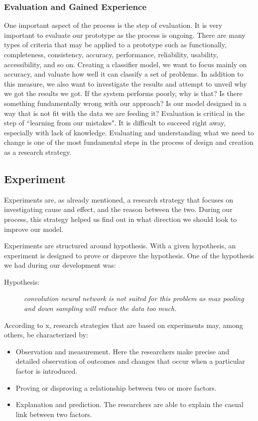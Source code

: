 \subsubsection{Evaluation and Gained Experience}
One important aspect of the process is the step of evaluation. It is very important to evaluate our prototype as the process is ongoing. There are many types of criteria that may be applied to a prototype such as functionally, completeness, consistency, accuracy, performance, reliability, usability, accessibility, and so on. Creating a classifier model, we want to focus mainly on accuracy, and valuate how well it can classify a set of problems. In addition to this measure, we also want to investigate the results and attempt to unveil why we got the results we got. If the system performs poorly, why is that? Is there something fundamentally wrong with our approach? Is our model designed in a way that is not fit with the data we are feeding it? Evaluation is critical in the step of ``learning from our mistakes". It is difficult to succeed right away, especially with lack of knowledge. Evaluating and understanding what we need to change is one of the most fundamental steps in the process of design and creation as a research strategy.

\subsection{Experiment}
Experiments are, as already mentioned, a research strategy that focuses on investigating cause and effect, and the reason between the two. During our process, this strategy helped us find out in what direction we should look to improve our model.

Experiments are structured around hypothesis. With a given hypothesis, an experiment is designed to prove or disprove the hypothesis. One of the hypothesis we had during our development was:

\begin{description}
    \item[Hypothesis:]{\textit{convolution neural network is not suited for this problem as max pooling and down sampling will reduce the data too much.}}
\end{description}

According to x, research strategies that are based on experiments may, among others, be characterized by:

\begin{itemize}
    \item Observation and measurement. Here the researchers make precise and detailed observation of outcomes and changes that occur when a particular factor is introduced.
    \item Proving or disproving a relationship between two or more factors.
    \item Explanation and prediction. The researchers are able to explain the casual link between two factors.
\end{itemize}

